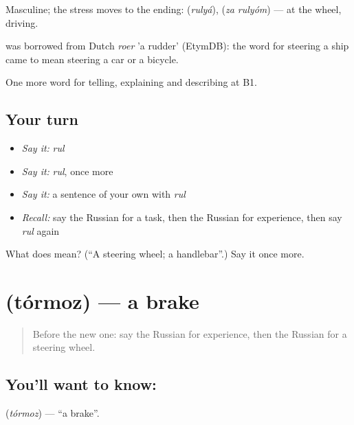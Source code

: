 Masculine; the stress moves to the ending: \emph{} (\emph{rulyá}), \emph{ } (\emph{za rulyóm}) — at the wheel, driving.

\begin{cousinweb}
\emph{} was borrowed from Dutch \emph{roer} 'a rudder' (EtymDB): the word for steering a ship came to mean steering a car or a bicycle.
\end{cousinweb}

\begin{grammarlens}[title={What you've built}]
One more word for telling, explaining and describing at B1.
\end{grammarlens}

\subsection*{Your turn}
\begin{itemize}
\raggedright
  \item \emph{Say it:} \emph{rul}
  \item \emph{Say it:} \emph{rul}, once more
  \item \emph{Say it:} a sentence of your own with \emph{rul}
  \item \emph{Recall:} say the Russian for a task, then the Russian for experience, then say \emph{rul} again
\end{itemize}

\begin{tcolorbox}[breakable,colback=teal!4,colframe=teal!35!black,title={Before you move on}]
What does  mean? (\textquotedblleft{}A steering wheel; a handlebar\textquotedblright{}.) Say it once more.
\end{tcolorbox}
\section[\texorpdfstring{\ru{тормоз} (tórmoz)}{тормоз (tórmoz)}]{ (tórmoz) — a brake}

\label{lesson:RU-C403-tormoz}



\begin{quote}
Before the new one: say the Russian for experience, then the Russian for a steering wheel.
\end{quote}

\subsection*{You'll want to know: }
\textbf{} (\emph{tórmoz}) — \textquotedblleft{}a brake\textquotedblright{}.

